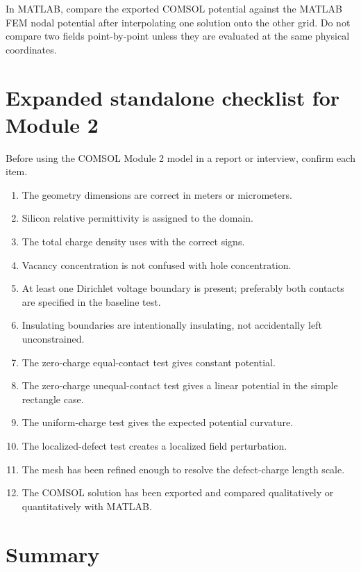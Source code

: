 \documentclass[11pt]{article}
\newcommand{\code}[1]{\texttt{\detokenize{#1}}}
\begin{document}
In MATLAB, compare the exported COMSOL potential against the MATLAB FEM nodal potential after interpolating one solution onto the other grid. Do not compare two fields point-by-point unless they are evaluated at the same physical coordinates.

\section{Expanded standalone checklist for Module 2}

Before using the COMSOL Module 2 model in a report or interview, confirm each item.

\begin{enumerate}[leftmargin=2em]
\item The geometry dimensions are correct in meters or micrometers.
\item Silicon relative permittivity is assigned to the domain.
\item The total charge density uses \code{q0*(p-n+NDp-NAm)+rho_def} with the correct signs.
\item Vacancy concentration is not confused with hole concentration.
\item At least one Dirichlet voltage boundary is present; preferably both contacts are specified in the baseline test.
\item Insulating boundaries are intentionally insulating, not accidentally left unconstrained.
\item The zero-charge equal-contact test gives constant potential.
\item The zero-charge unequal-contact test gives a linear potential in the simple rectangle case.
\item The uniform-charge test gives the expected potential curvature.
\item The localized-defect test creates a localized field perturbation.
\item The mesh has been refined enough to resolve the defect-charge length scale.
\item The COMSOL solution has been exported and compared qualitatively or quantitatively with MATLAB.
\end{enumerate}


\section{Summary}
\end{document}
